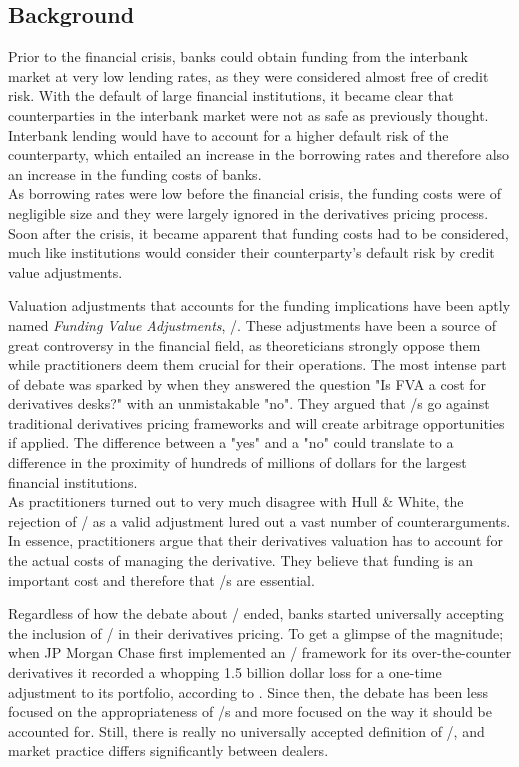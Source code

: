 \documentclass[main.tex]{subfiles}
\begin{document}
    \subsection{Background}
        
    Prior to the financial crisis, banks could obtain funding from the interbank market
    at very low lending rates, as they were considered almost free of credit risk.
    With the default of large financial institutions, 
    it became clear that counterparties in the interbank market 
    were not as safe as previously thought.
    Interbank lending would have to account for a higher default risk of the counterparty,
    which entailed an increase in the borrowing rates 
    and therefore also an increase in the funding costs of banks.
    \\
    As borrowing rates were low before the financial crisis, 
    the funding costs were of negligible size 
    and they were largely ignored in the derivatives pricing process.
    Soon after the crisis, it became apparent that funding costs had to be considered,
    much like institutions would consider their counterparty's default risk by 
    credit value adjustments.

    Valuation adjustments that accounts for the funding implications 
    have been aptly named \textit{Funding Value Adjustments}, \FVA/.
    These adjustments have been a source of great controversy in the financial field,
    as theoreticians strongly oppose them while practitioners deem them crucial for their operations.
    The most intense part of debate was sparked by \textcite{HullWhite2012FVA}
    when they answered the question "Is FVA a cost for derivatives desks?" 
    with an unmistakable "no".
    They argued that \FVA/s go against traditional derivatives pricing frameworks
    and will create arbitrage opportunities if applied.
    The difference between a "yes" and a "no" could translate to a difference 
    in the proximity of hundreds of millions of dollars for the largest financial institutions.
    \\
    As practitioners turned out to very much disagree with Hull \& White,
    the rejection of \FVA/ as a valid adjustment lured out a vast number of counterarguments.
    In essence, practitioners argue that their derivatives valuation 
    has to account for the actual costs of managing the derivative.
    They believe that funding is an important cost and therefore that \FVA/s are essential.

    Regardless of how the debate about \FVA/ ended, banks started universally accepting the inclusion of \FVA/
    in their derivatives pricing.
    To get a glimpse of the magnitude; when JP Morgan Chase first implemented an \FVA/ framework
    for its over-the-counter derivatives it recorded a whopping 1.5 billion dollar loss
    for a one-time adjustment to its portfolio, according to \textcite{JPMorganEarnings}.
    Since then, the debate has been less focused on the appropriateness of \FVA/s
    and more focused on the way it should be accounted for.
    Still, there is really no universally accepted definition of \FVA/,
    and market practice differs significantly between dealers.
\end{document}
